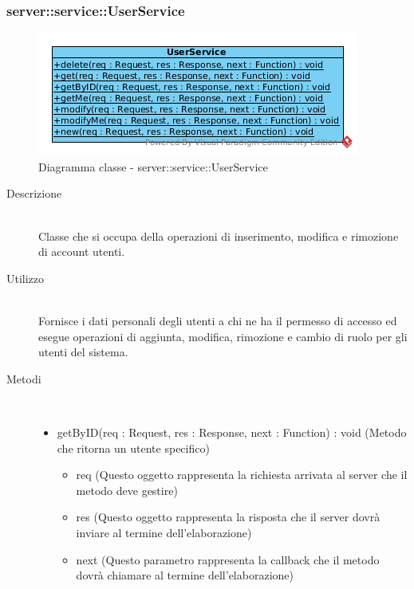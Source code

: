 \subsubsection[UserService]{server::service::UserService}
\begin{center}
			\begin{figure}[H]
				\centering \includegraphics[scale=4, max width=\textwidth, max height=\myheight]{../img/diagrammiClassi/server/service/UserService.png}
				\caption{Diagramma classe - server::service::UserService}
			\end{figure}
		\end{center}\begin{description}
\item[Descrizione] \hfill \\
 Classe che si occupa della operazioni di inserimento, modifica e rimozione di account utenti.
\item[Utilizzo] \hfill \\
 Fornisce i dati personali degli utenti a chi ne ha il permesso di accesso ed esegue operazioni di aggiunta, modifica, rimozione e cambio di ruolo per gli utenti del sistema.
\item[Metodi] \hfill \\
 \vspace{-7mm}
\begin{itemize}
\item getByID(req : Request, res : Response, next : Function) : void (Metodo che ritorna un utente specifico)\begin{itemize}
\item req (Questo oggetto rappresenta la richiesta arrivata al server che il metodo deve gestire)
\item res (Questo oggetto rappresenta la risposta che il server dovrà inviare al termine dell'elaborazione)
\item next (Questo parametro rappresenta la callback che il metodo dovrà chiamare al termine dell’elaborazione)
\end{itemize}


\end{itemize}
\end{description}

